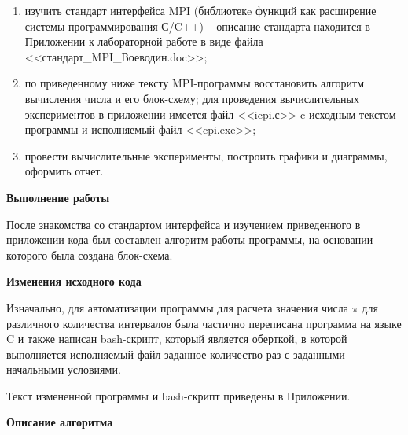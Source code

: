 \documentclass{altsu-bachelor}
\begin{document}
\begin{enumerate}
    \item изучить стандарт интерфейса MPI (библиотекe функций как расширение системы программирования С/C++) – описание стандарта находится в Приложении к лабораторной работе в виде файла <<стандарт\_MPI\_Воеводин.doc>>;

    \item по приведенному ниже тексту MPI-программы восстановить алгоритм вычисления числа  и его блок-схему; для проведения вычислительных экспериментов в приложении имеется файл <<icpi.с>> c исходным текстом программы и исполняемый файл <<cpi.exe>>;

    \item провести вычислительные эксперименты, построить графики и диаграммы, оформить отчет.
\end{enumerate}

\textbf{Выполнение работы}

После знакомства со стандартом интерфейса и изучением приведенного в приложении кода был составлен алгоритм работы программы, на основании которого была создана блок-схема.

\textbf{Изменения исходного кода}

Изначально, для автоматизации программы для расчета значения числа $\pi$ для различного количества интервалов была частично переписана программа на языке C и также написан bash-скрипт, который является оберткой, в которой выполняется исполняемый файл заданное количество раз с заданными начальными условиями.

Текст измененной программы и bash-скрипт приведены в Приложении.

\textbf{Описание алгоритма}
\end{document}
